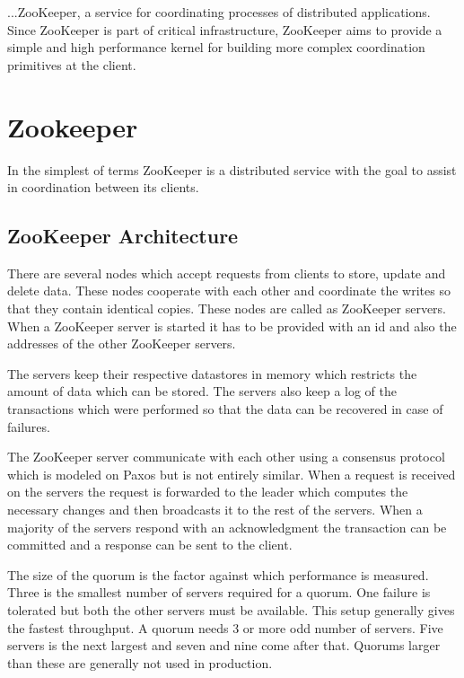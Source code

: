 \begin{savequote}[100mm]
...ZooKeeper, a service for coordinating processes of distributed applications. Since ZooKeeper is part of critical infrastructure, ZooKeeper aims to provide a simple and high performance kernel for building more complex coordination primitives at the client.
\end{savequote}

\chapter{Zookeeper}
In the simplest of terms ZooKeeper is a distributed service with the goal to assist in coordination between its clients.
\section{ZooKeeper Architecture}

There are several nodes which accept requests from clients to store, update and delete data. These nodes cooperate with each other and coordinate the writes so that they contain identical copies. These nodes are called as ZooKeeper servers. When a ZooKeeper server is started it has to be provided with an id and also the addresses of the other ZooKeeper servers. 

The servers keep their respective datastores in memory which restricts the amount of data which can be stored. The servers also keep a log of the transactions which were performed so that the data can be recovered in case of failures.



The ZooKeeper server communicate with each other using a consensus protocol which is modeled on Paxos but is not entirely similar. When a request is received on the servers the request is forwarded to the leader which computes the necessary changes and then broadcasts it to the rest of the servers. When a majority of the servers respond with an acknowledgment the transaction can be committed and a response can be sent to the client. 

The size of the quorum is the factor against which performance is measured. Three is the smallest number of servers required for a quorum. One failure is tolerated but both the other servers must be available. This setup generally gives the fastest throughput. A quorum needs 3 or more odd number of servers. Five servers is the next largest and seven and nine come after that. Quorums larger than these are generally not used in production.

